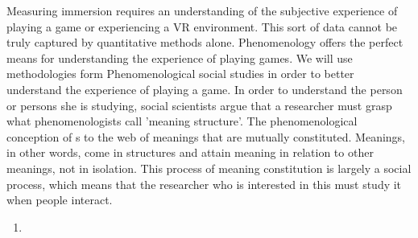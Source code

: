 Measuring immersion requires an understanding of the subjective experience of playing a game or experiencing a VR environment. This sort of data cannot be truly captured by quantitative methods alone. Phenomenology offers the perfect means for understanding the experience of playing games. We will use methodologies form Phenomenological social studies in order to better understand the experience of playing a game. In order to understand the person or persons she is studying, social scientists argue that a researcher must grasp what phenomenologists call 'meaning structure'. The phenomenological conception of s to the web of meanings that are mutually constituted. Meanings, in other words, come in structures and attain meaning in relation to other meanings, not in isolation. This process of meaning constitution is largely a social process, which means that the researcher who is interested in this must study it when people interact. \begin{enumerate}
 	\item 
 \end{enumerate}
